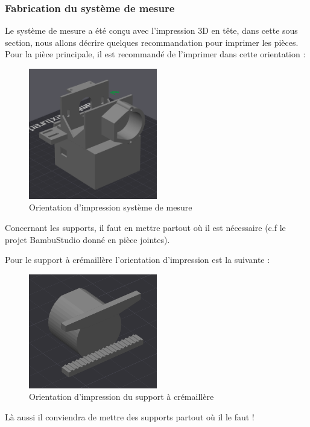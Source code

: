 \newpage
\subsubsection{Fabrication du système de mesure}
Le système de mesure a été conçu avec l'impression 3D en tête, dans cette sous section, nous allons décrire quelques recommandation pour imprimer les pièces.
Pour la pièce principale, il est recommandé de l'imprimer dans cette orientation :

\begin{figure}[H]
    \centering
    \includegraphics[width = 0.5\textwidth]{assets/figures/ameliorations/orientation_impression_systeme_mesure.png}
    \caption{Orientation d'impression système de mesure}
\end{figure}
Concernant les supports, il faut en mettre partout où il est nécessaire (c.f le projet BambuStudio donné en pièce jointes).

Pour le support à crémaillère l'orientation d'impression est la suivante :
\begin{figure}[H]
    \centering
    \includegraphics[width = 0.5\textwidth]{assets/figures/ameliorations/orientation_support_crémaillère.png}
    \caption{Orientation d'impression du support à crémaillère}
\end{figure}
Là aussi il conviendra de mettre des supports partout où il le faut !

